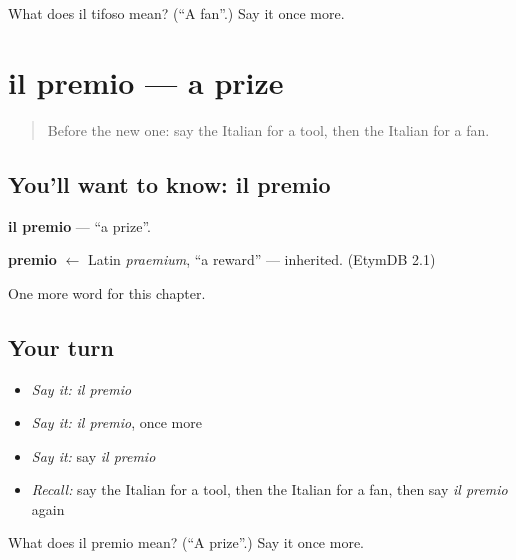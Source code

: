 \begin{tcolorbox}[breakable,colback=teal!4,colframe=teal!35!black,title={Before you move on}]
What does il tifoso mean? (\textquotedblleft{}A fan\textquotedblright{}.) Say it once more.
\end{tcolorbox}
\section[il premio]{il premio — a prize}

\label{lesson:IT-C258-premio}



\begin{quote}
Before the new one: say the Italian for a tool, then the Italian for a fan.
\end{quote}

\subsection*{You'll want to know: il premio}
\textbf{il premio} — \textquotedblleft{}a prize\textquotedblright{}.

\begin{cousinweb}
\textbf{premio} $\leftarrow$ Latin \emph{praemium}, \textquotedblleft{}a reward\textquotedblright{} — inherited. (EtymDB 2.1)
\end{cousinweb}

\begin{grammarlens}[title={What you've built}]
One more word for this chapter.
\end{grammarlens}

\subsection*{Your turn}
\begin{itemize}
\raggedright
  \item \emph{Say it:} \emph{il premio}
  \item \emph{Say it:} \emph{il premio}, once more
  \item \emph{Say it:} say \emph{il premio}
  \item \emph{Recall:} say the Italian for a tool, then the Italian for a fan, then say \emph{il premio} again
\end{itemize}

\begin{tcolorbox}[breakable,colback=teal!4,colframe=teal!35!black,title={Before you move on}]
What does il premio mean? (\textquotedblleft{}A prize\textquotedblright{}.) Say it once more.
\end{tcolorbox}
